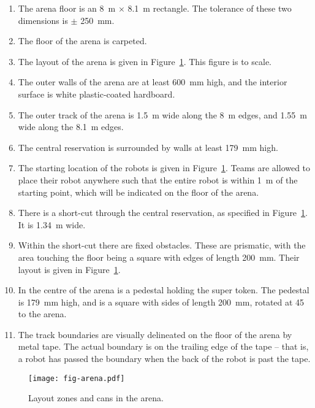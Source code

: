 \begin{enumerate}
  \item The arena floor is an \SI{8}{m} $\times$ \SI{8.1}{m} rectangle. The
        tolerance of these two dimensions is $\pm$ \SI{250}{mm}.
  \item The floor of the arena is carpeted.
  \item The layout of the arena is given in Figure~\ref{fig:arena}. This
        figure is to scale.
  \item The outer walls of the arena are at least \SI{600}{mm} high, and the
        interior surface is white plastic-coated hardboard.
  \item The outer track of the arena is \SI{1.5}{m} wide along the \SI{8}{m}
        edges, and \SI{1.55}{m} wide along the \SI{8.1}{m} edges.
  \item The central reservation is surrounded by walls at least \SI{179}{mm}
        high.
  \item The starting location of the robots is given in Figure~\ref{fig:arena}.
        Teams are allowed to place their robot anywhere such that the entire
        robot is within \SI{1}{m} of the starting point, which will be
        indicated on the floor of the arena.
  \item There is a short-cut through the central reservation, as specified in
        Figure~\ref{fig:arena}. It is \SI{1.34}{m} wide.
  \item Within the short-cut there are fixed obstacles. These are prismatic,
        with the area touching the floor being a square with edges of length
        \SI{200}{mm}. Their layout is given in Figure~\ref{fig:arena}.
  \item In the centre of the arena is a pedestal holding the super token. The
        pedestal is \SI{179}{mm} high, and is a square with sides of length
        \SI{200}{mm}, rotated at 45\degree{} to the arena.
  \item The track boundaries are visually delineated on the floor of the arena
        by metal tape. The actual boundary is on the trailing edge of the tape
        -- that is, a robot has passed the boundary when the back of the robot
        is past the tape.
\end{enumerate}

\begin{figure}
  \texttt{[image: fig-arena.pdf]}
  \caption{Layout zones and cans in the arena.}
  \label{fig:arena}
\end{figure}

